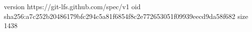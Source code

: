 version https://git-lfs.github.com/spec/v1
oid sha256:a7c252b20486179bfc294c5a81f6854f8c2e772653051f09939eecd9da58f682
size 1438
